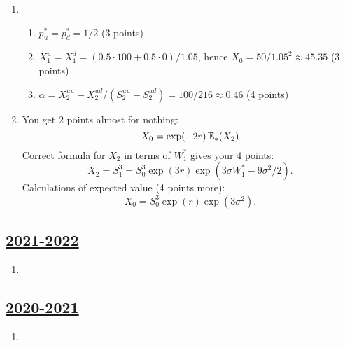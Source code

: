 \begin{enumerate}
\item \begin{enumerate}
    \item $p^*_u = p^*_d = 1/2$ (3 points)
    \item $X_1^u = X_1^d = (0.5\cdot 100 + 0.5\cdot 0) / 1.05$, hence $X_0 = 50/1.05^2 \approx 45.35$ (3 points)
    \item $\alpha = X_2^{uu} - X_2^{ud} / (S_2^{uu} - S_2^{ud}) = 100/216 \approx 0.46$ (4 points)
\end{enumerate}

\item 
You get 2 points almost for nothing:
\[
X_0 = \exp(-2r) \operatorname{\mathbb{E}}_{*}(X_2)    
\]
Correct formula for $X_2$ in terms of $W_1^*$ gives your 4 points:
\[
X_2 = S_1^3 = S_0^3 \exp(3r)\exp(3\sigma W_1^* - 9\sigma^2/2).    
\]
Calculations of expected value (4 points more):
\[
X_0 = S_0^3 \exp(r)\exp(3\sigma^2).    
\]

\end{enumerate}

\subsection[2021-2022]{\hyperref[sec:kr_02_2021_2022]{2021-2022}}
\label{sec:sol_kr_02_2021_2022} %



\begin{enumerate}

\item 


\end{enumerate}
    

\subsection[2020-2021]{\hyperref[sec:kr_02_2020_2021]{2020-2021}}
\label{sec:sol_kr_02_2020_2021} %



\begin{enumerate}
    
    
    
    \item
 
 
\end{enumerate}



